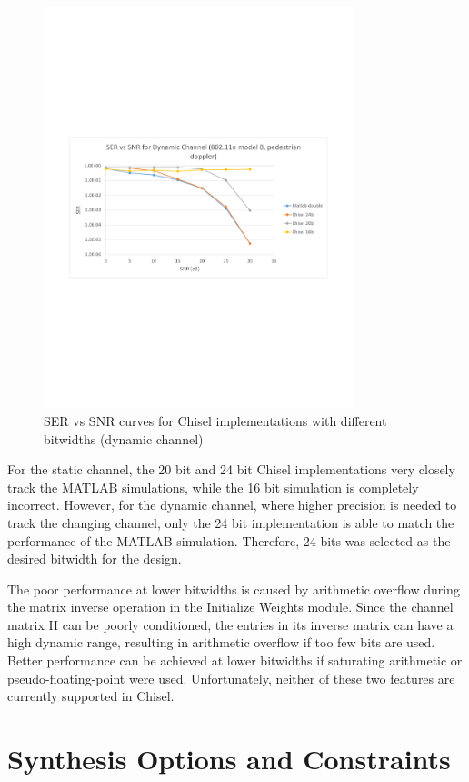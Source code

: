 \documentclass[journal]{IEEEtran}
\begin{document}
\begin{figure}[!h]
\centering
\includegraphics*[width=9cm, viewport = 80 270 560 530]{images/snr_ber_curves_chisel_doppler.pdf}
\caption{SER vs SNR curves for Chisel implementations with different bitwidths (dynamic channel)}
\label{ser_ber_chisel_dynamic}
\end{figure}

For the static channel, the 20 bit and 24 bit Chisel implementations very closely track the MATLAB simulations, while the 16 bit simulation is completely incorrect. However, for the dynamic channel, where higher precision is needed to track the changing channel, only the 24 bit implementation is able to match the performance of the MATLAB simulation. Therefore, 24 bits was selected as the desired bitwidth for the design.

The poor performance at lower bitwidths is caused by arithmetic overflow during the matrix inverse operation in the Initialize Weights module. Since the channel matrix H can be poorly conditioned, the entries in its inverse matrix can have a high dynamic range, resulting in arithmetic overflow if too few bits are used. Better performance can be achieved at lower bitwidths if saturating arithmetic or pseudo-floating-point were used. Unfortunately, neither of these two features are currently supported in Chisel.


\section{Synthesis Options and Constraints}
\end{document}
